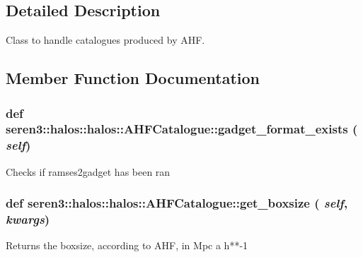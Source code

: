 \subsection{Detailed Description}
\begin{DoxyVerb}
Class to handle catalogues produced by AHF.
\end{DoxyVerb}
 

\subsection{Member Function Documentation}
\hypertarget{classseren3_1_1halos_1_1halos_1_1AHFCatalogue_a422ec3eb34ba04173302d5249d78b78b}{
\subsubsection[{gadget\_\-format\_\-exists}]{\setlength{\rightskip}{0pt plus 5cm}def seren3::halos::halos::AHFCatalogue::gadget\_\-format\_\-exists ( {\em self})}}
\label{classseren3_1_1halos_1_1halos_1_1AHFCatalogue_a422ec3eb34ba04173302d5249d78b78b}
\begin{DoxyVerb}
Checks if ramses2gadget has been ran
\end{DoxyVerb}
 \hypertarget{classseren3_1_1halos_1_1halos_1_1AHFCatalogue_a4fa830e24420fe291b6c5614ee835769}{
\subsubsection[{get\_\-boxsize}]{\setlength{\rightskip}{0pt plus 5cm}def seren3::halos::halos::AHFCatalogue::get\_\-boxsize ( {\em self}, \/   {\em kwargs})}}
\label{classseren3_1_1halos_1_1halos_1_1AHFCatalogue_a4fa830e24420fe291b6c5614ee835769}
\begin{DoxyVerb}
Returns the boxsize, according to AHF, in Mpc a h**-1
\end{DoxyVerb}
 

